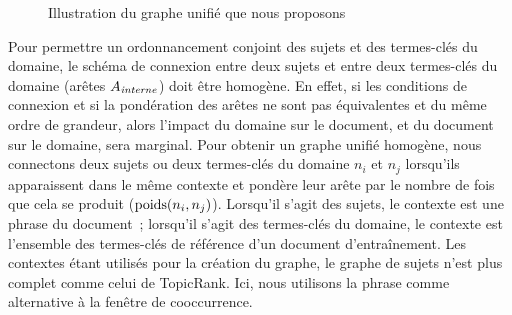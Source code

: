 \begin{figure}
      \caption{Illustration du graphe unifié que nous proposons 
               \label{fig:topiccorank_graph}}
    \end{figure}

    Pour permettre un ordonnancement conjoint des sujets et des termes-clés du
    domaine, le schéma de connexion entre deux sujets et entre deux termes-clés
    du domaine (arêtes $A_\textnormal{\textit{interne}}$) doit être homogène. En
    effet, si les conditions de connexion et si la pondération des arêtes ne
    sont pas équivalentes et du même ordre de grandeur, alors l'impact du
    domaine sur le document, et du document sur le domaine, sera marginal. Pour
    obtenir un graphe unifié homogène, nous connectons deux sujets ou deux
    termes-clés du domaine $n_i$ et $n_j$ lorsqu'ils apparaissent dans le même
    contexte et pondère leur arête par le nombre de fois que cela se produit
    ($\textnormal{poids}(n_i, n_j)$). Lorsqu'il s'agit des sujets, le contexte
    est une phrase du document~; lorsqu'il s'agit des termes-clés du domaine, le
    contexte est l'ensemble des termes-clés de référence d'un document
    d'entraînement. Les contextes étant utilisés pour la création du graphe, le
    graphe de sujets n'est plus complet comme celui de TopicRank. Ici, nous
    utilisons la phrase comme alternative à la fenêtre de cooccurrence.

